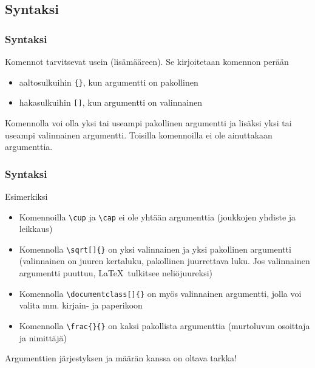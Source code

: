 \subsection{Syntaksi}
\begin{frame}[fragile]
    \frametitle{Syntaksi}
    Komennot tarvitsevat usein  (lisämääreen). \pause Se kirjoitetaan komennon perään
    \begin{itemize}[<+->]
        \item aaltosulkuihin \lstinline-{}-, kun argumentti on pakollinen
        \item hakasulkuihin \lstinline-[]-, kun argumentti on valinnainen
    \end{itemize}
    \pause
    Komennolla voi olla yksi tai useampi pakollinen argumentti ja lisäksi yksi tai useampi valinnainen argumentti. \pause Toisilla komennoilla ei ole ainuttakaan argumenttia.
\end{frame}

\begin{frame}[fragile]
    \frametitle{Syntaksi}
    Esimerkiksi 
    \begin{itemize}[<+->]
        \item Komennoilla \lstinline-\cup- ja \lstinline-\cap- ei ole yhtään argumenttia (joukkojen yhdiste ja leikkaus)
        \item Komennolla \lstinline-\sqrt[]{}- on yksi valinnainen ja yksi pakollinen argumentti (valinnainen on juuren kertaluku, pakollinen juurrettava luku. Jos valinnainen argumentti puuttuu, \LaTeX\ tulkitsee neliöjuureksi)
        \item Komennolla \lstinline-\documentclass[]{}- on myös valinnainen argumentti, jolla voi valita mm. kirjain- ja paperikoon
        \item Komennolla \lstinline-\frac{}{}- on kaksi pakollista argumenttia (murtoluvun osoittaja ja nimittäjä)
    \end{itemize}
    \pause
    Argumenttien järjestyksen ja määrän kanssa on oltava tarkka!
\end{frame}


